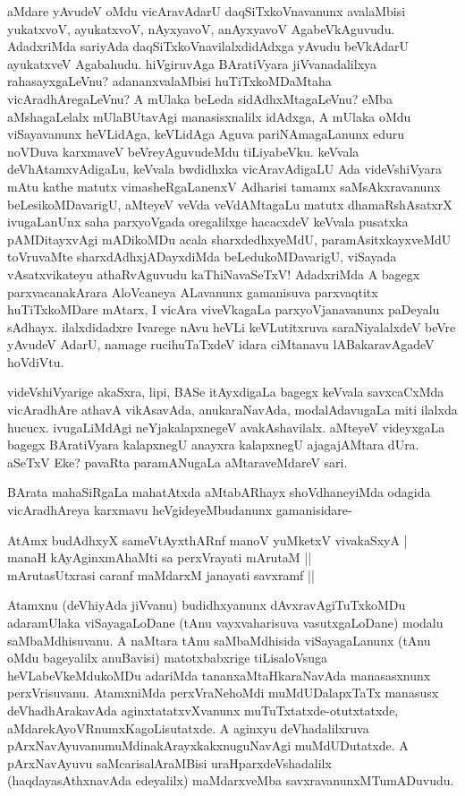 aMdare yAvudeV oMdu vicAravAdarU daqSiTxkoVnavanunx avalaMbisi yukatxvoV, ayukatxvoV, nAyxyavoV, anAyxyavoV AgabeVkAguvudu. AdadxriMda sariyAda daqSiTxkoVnavilalxdidAdxga yAvudu beVkAdarU ayukatxveV Agabahudu. hiVgiruvAga BAratiVyara jiVvanadalilxya rahasayxgaLeVnu? ada\-nanxva\-laMbisi huTiTxkoMDaMtaha vicAradhAregaLeVnu? A mUlaka beLeda sidAdhxMtagaLeVnu? eMba aMsha\-gaLelalx mUlaBUtavAgi manasisxnalilx idAdxga, A mUlaka oMdu viSayavanunx heVLidAga, keVLidAga Aguva pariNAmagaLanunx eduru noVDuva karxmaveV beVreyAguvudeMdu tiLiyabeVku. keVvala deVhAtamx\-vAdi\-gaLu, keVvala bwdidhxka vicAravAdigaLU Ada videVshiVyara mAtu kathe matutx vimasheRgaLanenxV Adha\-risi tamamx saMsAkxravanunx beLesikoMDavarigU, aMteyeV veVda veVdAMtagaLu matutx dhamaRshAsatxrX ivu\-gaLanUnx saha parxyoVgada oregalilxge hacacxdeV keVvala pusatxka pAMDitayxvAgi mADikoMDu acala sharxdedhx\-yeMdU, paramAsitxkayxveMdU toVruvaMte sharxdAdhxjADayxdiMda beLedukoMDavarigU, viSayada vAsatxvi\-kateyu athaR\-vAguvudu kaThiNavaSeTxV! AdadxriMda A bagegx parxvacanakArara AloVcaneya ALavanunx gamani\-suva parx\-vaqtitx huTiTxkoMDare mAtarx, I vicAra viveVkagaLa parxyoVjanavanunx paDeyalu sAdhayx. ilalxdidadxre Ivarege nAvu heVLi keVLutitxruva saraNiyalalxdeV beVre yAvudeV AdarU, namage rucihuTaTxdeV idara ciMtanavu lABakaravAgadeV hoVdiVtu.

videVshiVyarige akaSxra, lipi, BASe itAyxdigaLa bagegx keVvala savxcaCxMda vicAradhAre athavA vikAsa\-vAda, anukaraNavAda, modalAdavugaLa miti ilalxda hucucx. ivugaLiMdAgi neYjakalapxnegeV avakAsha\-vilalx. aMteyeV\- videyxgaLa bagegx BAratiVyara kalapxnegU anayxra kalapxnegU ajagajAMtara dUra. aSeTxV Eke? pavaRta paramANugaLa aMtaraveMdareV sari.

BArata mahaSiRgaLa mahatAtxda aMtabARhayx shoVdhaneyiMda odagida vicAradhAreya karxmavu \-heVgide\-yeMbu\-danunx gamanisidare-

\begin{shloka}
AtAmx budAdhxyX sameVtAyxthARnf manoV yuMketxV vivakaSxyA |\\
manaH kAyAginxmAhaMti sa perxVrayati mArutaM ||\\
mArutasUtxrasi caranf maMdarxM janayati savxramf ||\\
\end{shloka}

Atamxnu (deVhiyAda jiVvanu) budidhxyanunx dAvxravAgiTuTxkoMDu adara\break \hbox{mUlaka} viSaya\-gaLoDane (tAnu vayxvaharisuva vasutxgaLoDane) modalu saMbaMdhi\-suvanu. A naMtara tAnu saMbaMdhisida viSaya\-gaLanunx (tAnu oMdu bageyalilx anuBavisi) matotxbabxrige tiLisaloVsuga heVLa\-beVkeMdu\-koMDu ada\-riMda tananx\break aMtaHkaraNavAda manasasxnunx perxVrisuvanu. AtamxniMda perxVraNehoMdi muMdUDa\-lapxTaTx manasusx deVhadhArakavAda aginxtatatxvXvanunx muTuTxtatxde-otutxtatxde, aMdare\break kAyoVR\-numxKagoLisutatxde. A aginxyu deVhadalilxruva pArxNavAyuvanu\break muMdina\-kArayxkakxnuguNavAgi muMdUDutatxde. A pArxNavAyuvu saMcarisalA\-raMBisi uraHparxdeVshadalilx (haqdayasAthxnavAda edeyalilx) maMdarxveMba savxra\break\-vanunxMTu\-mADuvudu.


